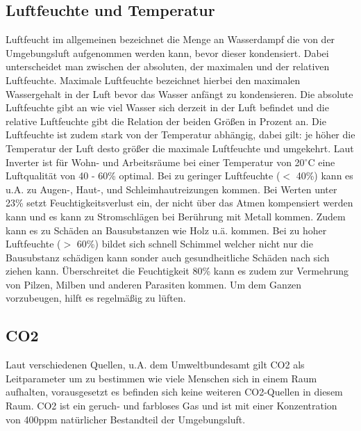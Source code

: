 \documentclass[]{article}
\begin{document}
		\subsection{Luftfeuchte und Temperatur}
			Luftfeucht im allgemeinen bezeichnet die Menge an Wasserdampf die von der Umgebungsluft aufgenommen werden kann, bevor dieser kondensiert. Dabei unterscheidet man zwischen der absoluten, der maximalen und der relativen Luftfeuchte. Maximale Luftfeuchte bezeichnet hierbei den maximalen Wassergehalt in der Luft bevor das Wasser anfängt zu kondensieren. Die absolute Luftfeuchte gibt an wie viel Wasser sich derzeit in der Luft befindet und die relative Luftfeuchte gibt die Relation der beiden Größen in Prozent an. Die Luftfeuchte ist zudem stark von der Temperatur abhängig, dabei gilt: je höher die Temperatur der Luft desto größer die maximale Luftfeuchte und umgekehrt. Laut Inverter\cite{luftquali_inventer} ist für Wohn- und Arbeitsräume bei einer Temperatur von 20$^\circ$C eine Luftqualität von 40 - 60\% optimal. Bei zu geringer Luftfeuchte ($<$ 40\%) kann es u.A. zu Augen-, Haut-, und Schleimhautreizungen kommen. Bei Werten unter 23\% setzt Feuchtigkeitsverlust ein, der nicht über das Atmen kompensiert werden kann und es kann zu Stromschlägen bei Berührung mit Metall kommen. Zudem kann es zu Schäden an Bausubstanzen wie Holz u.ä. kommen. Bei zu hoher Luftfeuchte ($>$ 60\%) bildet sich schnell Schimmel welcher nicht nur die Bausubstanz schädigen kann sonder auch gesundheitliche Schäden nach sich ziehen kann. Überschreitet die Feuchtigkeit 80\% kann es zudem zur Vermehrung von Pilzen, Milben und anderen Parasiten kommen. Um dem Ganzen vorzubeugen, hilft es regelmäßig zu lüften.
		\subsection{CO2}
			Laut verschiedenen Quellen, u.A. dem Umweltbundesamt \cite{luftquali_bund_co2}\cite{luftquali_co2_corona} gilt CO2 als Leitparameter um zu bestimmen wie viele Menschen sich in einem Raum aufhalten, vorausgesetzt es befinden sich keine weiteren CO2-Quellen in diesem Raum. CO2 ist ein geruch- und farbloses Gas und ist mit einer Konzentration von 400ppm natürlicher Bestandteil der Umgebungsluft.
\end{document}
